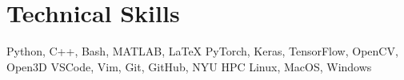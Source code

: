 \section{Technical Skills}

\setlength{\multicolsep}{-4pt}
\begin{multicols}{2}
\raggedcolumns

\resumeSubHeadingListStart
    {Python, C++, Bash, MATLAB, \LaTeX}
    {PyTorch, Keras, TensorFlow, OpenCV, Open3D}
    {VSCode, Vim, Git, GitHub, NYU HPC}
    {Linux, MacOS, Windows}
\resumeSubHeadingListEnd

\end{multicols}

